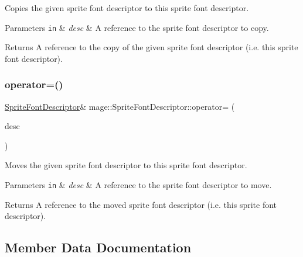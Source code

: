 Copies the given sprite font descriptor to this sprite font descriptor.


\begin{DoxyParams}[1]{Parameters}
\mbox{\tt in}  & {\em desc} & A reference to the sprite font descriptor to copy. \\
\hline
\end{DoxyParams}
\begin{DoxyReturn}{Returns}
A reference to the copy of the given sprite font descriptor (i.\+e. this sprite font descriptor). 
\end{DoxyReturn}
\hypertarget{structmage_1_1_sprite_font_descriptor_a4d7c7df43f32819446f35ef71f49ebac}{}\label{structmage_1_1_sprite_font_descriptor_a4d7c7df43f32819446f35ef71f49ebac} 
\subsubsection{\texorpdfstring{operator=()}{operator=()}\hspace{0.1cm}{\footnotesize\ttfamily [2/2]}}
{\footnotesize\ttfamily \hyperlink{structmage_1_1_sprite_font_descriptor}{Sprite\+Font\+Descriptor}\& mage\+::\+Sprite\+Font\+Descriptor\+::operator= (\begin{DoxyParamCaption}\item[{\hyperlink{structmage_1_1_sprite_font_descriptor}{Sprite\+Font\+Descriptor} \&\&}]{desc }\end{DoxyParamCaption})\hspace{0.3cm}{\ttfamily [default]}}

Moves the given sprite font descriptor to this sprite font descriptor.


\begin{DoxyParams}[1]{Parameters}
\mbox{\tt in}  & {\em desc} & A reference to the sprite font descriptor to move. \\
\hline
\end{DoxyParams}
\begin{DoxyReturn}{Returns}
A reference to the moved sprite font descriptor (i.\+e. this sprite font descriptor). 
\end{DoxyReturn}


\subsection{Member Data Documentation}
\hypertarget{structmage_1_1_sprite_font_descriptor_a7fa7230004e671127856e2ab1c27c94a}{}\label{structmage_1_1_sprite_font_descriptor_a7fa7230004e671127856e2ab1c27c94a} 
